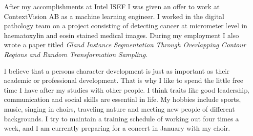 \documentclass[11pt,a4paper]{article} %
\begin{document}
After my accomplishments at Intel ISEF I was given an offer to work at ContextVision AB as a machine learning engineer. I worked in the digital pathology team on a project consisting of detecting cancer at micrometer level in haematoxylin and eosin stained medical images. During my employment I also wrote a paper titled \textit{Gland Instance Segmentation Through Overlapping Contour Regions and Random Transformation Sampling}.

I believe that a persons character development is just as important as their academic or professional development. That is why I like to spend the little free time I have after my studies with other people. I think traits like good leadership, communication and social skills are essential in life. My hobbies include sports, music, singing in choirs, traveling nature and meeting new people of different backgrounds. I try to maintain a training schedule of working out four times a week, and I am currently preparing for a concert in January with my choir.



\end{document}

